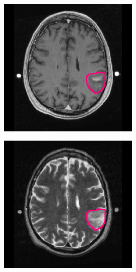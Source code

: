 \begin{subappendices}
\begin{figure}[htbp]
\begin{subfigure}[b]{0.95\textwidth}
\begin{subfigure}[b]{0.215\textwidth}
        \includegraphics[width=\textwidth, clip, trim=2.5cm 0.5cm 2.5cm 0.5cm]{Figures/Random_segs/T1GD_TCGA-FG-5964.png}
        \end{subfigure}
        \hfill
        \begin{subfigure}[b]{0.215\textwidth}
        \includegraphics[width=\textwidth, clip, trim=2.5cm 0.5cm 2.5cm 0.5cm]{Figures/Random_segs/T2_TCGA-FG-5964.png}

\end{subfigure}
\end{subfigure}
\end{figure}
\end{subappendices}

